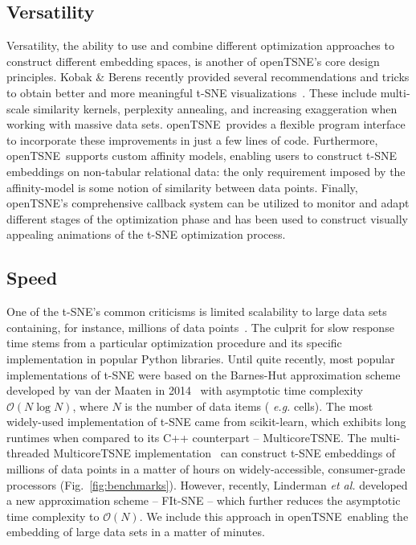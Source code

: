 \documentclass[twocolumn]{bmcart}
\newcommand{\opentsne}{\textsf{openTSNE}}
\begin{document}
\subsection*{Versatility}

Versatility, the ability to use and combine different optimization approaches to
construct different embedding spaces, is another of \opentsne's core design
principles. Kobak \& Berens recently provided several recommendations and
tricks to obtain better and more meaningful t-SNE
visualizations~\cite{kobak2019art}. These include multi-scale similarity
kernels, perplexity annealing, and increasing exaggeration when working with
massive data sets. \opentsne\ provides a flexible program interface to
incorporate these improvements in just a few lines of code. Furthermore, \opentsne\
supports custom affinity models, enabling users to construct t-SNE embeddings on
non-tabular relational data: the only requirement imposed by the affinity-model
is some notion of similarity between data points.
Finally, \opentsne's comprehensive callback system can be utilized
to monitor and adapt different stages of the optimization phase and has been
used to construct visually appealing animations of the t-SNE optimization
process.


\subsection*{Speed}

One of the t-SNE's common criticisms is limited scalability to large data sets
containing, for instance, millions of data
points~\cite{becht2019dimensionality}. The culprit for slow response time stems
from a particular optimization procedure and its specific implementation in
popular Python libraries. Until quite recently, most popular
implementations of t-SNE were based on the Barnes-Hut approximation scheme
developed by van der Maaten in 2014~\cite{van2014accelerating} with asymptotic
time complexity $\mathcal{O}(N \log N)$, where $N$ is the number of data items ({\em
e.g.} cells). The most widely-used implementation of t-SNE came from
\textsf{scikit-learn}, which exhibits long runtimes when compared to its C++
counterpart -- \textsf{MulticoreTSNE}. The multi-threaded \textsf{MulticoreTSNE}
implementation~\cite{Ulyanov2016} can construct t-SNE embeddings of millions of
data points in a matter of hours on widely-accessible, consumer-grade processors
(Fig.~\ref{fig:benchmarks}). However, recently, Linderman \textit{et al.}
developed a new approximation scheme -- FIt-SNE -- which further reduces the
asymptotic time complexity to $\mathcal{O}(N)$. We include this approach in
\opentsne\, enabling the embedding of large data sets in a matter of minutes. 
\end{document}
